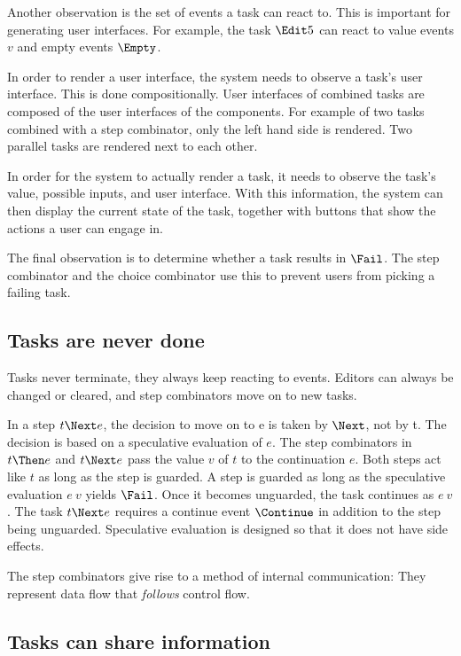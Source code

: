 Another observation is the set of events a task can react to.
This is important for generating user interfaces.
For example, the task $\Edit 5$ can react to value events $v$ and empty events $\Empty$.

In order to render a user interface, the system needs to observe a task's user interface.
This is done compositionally.
User interfaces of combined tasks are composed of the user interfaces of the components.
For example of two tasks combined with a step combinator, only the left hand side is rendered.
Two parallel tasks are rendered next to each other.

In order for the system to actually render a task, it needs to observe the task's value, possible inputs, and user interface.
With this information, the system can then display the current state of the task, together with buttons that show the actions a user can engage in.

The final observation is to determine whether a task results in $\Fail$.
The step combinator and the choice combinator use this to prevent users from picking a failing task.




\subsection{Tasks are never done}

Tasks never terminate, they always keep reacting to events.
Editors can always be changed or cleared, and step combinators move on to new tasks.

In a step $t \Next e$, the decision to move on to e is taken by $\Next$, not by t.
The decision is based on a speculative evaluation of $e$.
The step combinators in $t \Then e$ and $t \Next e$ pass the value $v$ of $t$ to the continuation $e$.
Both steps act like $t$ as long as the step is guarded.
A step is guarded as long as the speculative evaluation $e\ v$ yields $\Fail$.
Once it becomes unguarded, the task continues as $e\ v$.
The task $t \Next e$ requires a continue event $\Continue$ in addition to the step being unguarded.
Speculative evaluation is designed so that it does not have side effects.

The step combinators give rise to a method of internal communication:
They represent data flow that \emph{follows} control flow.




\subsection{Tasks can share information}

